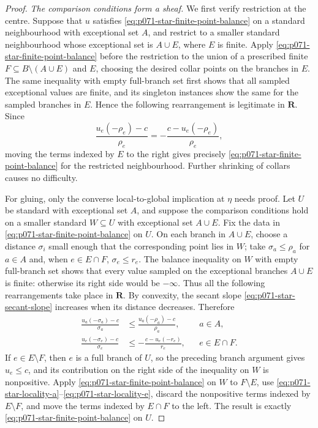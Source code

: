 \begin{proof}
\medskip\noindent
\emph{The comparison conditions form a sheaf.}
We first verify restriction at the centre.  Suppose that \(u\) satisfies
\eqref{eq:p071-star-finite-point-balance} on a standard neighbourhood
with exceptional set \(A\), and restrict to a smaller standard
neighbourhood whose exceptional set is \(A\cup E\), where \(E\) is
finite.  Apply \eqref{eq:p071-star-finite-point-balance} before the
restriction to the union of a prescribed finite
\(F\subseteq B\setminus(A\cup E)\) and \(E\), choosing the desired
collar points on the branches in \(E\).  The same inequality with empty
full-branch set first shows that all sampled exceptional values are
finite, and its singleton instances show the same for the sampled
branches in \(E\).  Hence the following rearrangement is legitimate in
\(\mathbf R\).  Since
\[
 \frac{u_e(-\rho_e)-c}{\rho_e}
      =-\frac{c-u_e(-\rho_e)}{\rho_e},
\]
moving the terms indexed by \(E\) to the right gives precisely
\eqref{eq:p071-star-finite-point-balance} for the restricted
neighbourhood.  Further shrinking of collars causes no difficulty.

For gluing, only the converse local-to-global implication at \(\eta\)
needs proof.  Let \(U\) be standard with exceptional set \(A\), and
suppose the comparison conditions hold on a smaller standard
\(W\subseteq U\) with exceptional set \(A\cup E\).  Fix the data in
\eqref{eq:p071-star-finite-point-balance} on \(U\).  On each branch in
\(A\cup E\), choose a distance \(\sigma_i\) small enough that the
corresponding point lies in \(W\); take
\(\sigma_a\leq\rho_a\) for \(a\in A\) and, when \(e\in E\cap F\),
\(\sigma_e\leq r_e\).  The balance inequality on \(W\) with empty
full-branch set shows that every value sampled on the exceptional
branches \(A\cup E\) is finite: otherwise its right side would be
\(-\infty\).  Thus all the following rearrangements take place in
\(\mathbf R\).  By convexity, the secant slope
\eqref{eq:p071-star-secant-slope} increases when its distance decreases.
Therefore
\begin{align}
 \frac{u_a(-\sigma_a)-c}{\sigma_a}
   &\leq\frac{u_a(-\rho_a)-c}{\rho_a},
       &&a\in A,                                      \label{eq:p071-star-locality-a}\\
 \frac{u_e(-\sigma_e)-c}{\sigma_e}
   &\leq-\frac{c-u_e(-r_e)}{r_e},
       &&e\in E\cap F.                                \label{eq:p071-star-locality-e}
\end{align}
If \(e\in E\setminus F\), then \(e\) is a full branch of \(U\), so the
preceding branch argument gives \(u_e\leq c\), and its contribution on
the right side of the inequality on \(W\) is nonpositive.  Apply
\eqref{eq:p071-star-finite-point-balance} on \(W\) to \(F\setminus E\),
use \eqref{eq:p071-star-locality-a}--\eqref{eq:p071-star-locality-e},
discard the nonpositive terms indexed by \(E\setminus F\), and move the
terms indexed by \(E\cap F\) to the left.  The result is exactly
\eqref{eq:p071-star-finite-point-balance} on \(U\).


\end{proof}
